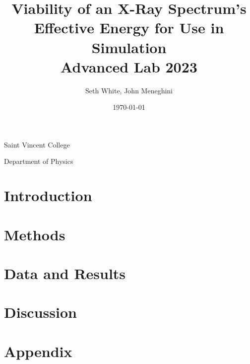 \documentclass[12pt, letterpaper]{article}
\title{Viability of an X-Ray Spectrum's Effective Energy for Use in Simulation \\
    \large Advanced Lab 2023}
\author{Seth White, John Meneghini}
\date{\today}
\begin{document}
    \maketitle

\centerline{\large Saint Vincent College}
\centerline{Department of Physics}

    \begin{abstract}
        
    \end{abstract}
\newpage
	
    \section*{Introduction}
    


    \section*{Methods}
    

	\newpage
    \section*{Data and Results}
    

    \section*{Discussion}
    

    \newpage
    
    
    \newpage
	\section*{Appendix}
    
\end{document}
